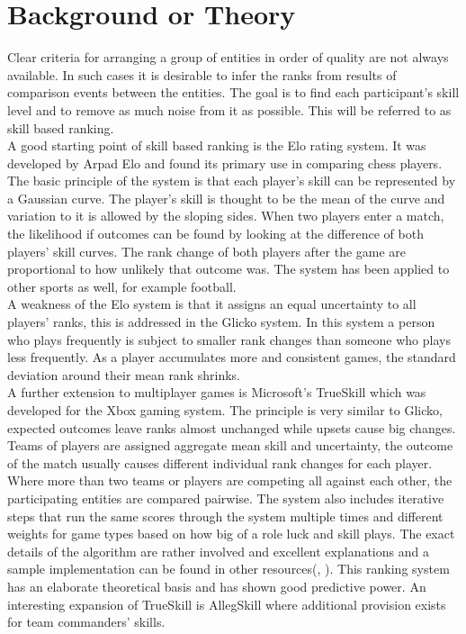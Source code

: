 \section{Background or Theory}
Clear criteria for arranging a group of entities in order of quality are not always available. In such cases it is desirable to infer the ranks from results of comparison events between the entities. The goal is to find each participant's skill level and to remove as much noise from it as possible. This will be referred to as skill based ranking.\\
A good starting point of skill based ranking is the Elo rating system\cite{elo}. It was developed by Arpad Elo and found its primary use in comparing chess players. The basic principle of the system is that each player's skill can be represented by a Gaussian curve. The player's skill is thought to be the mean of the curve and variation to it is allowed by the sloping sides. When two players enter a match, the likelihood if outcomes can be found by looking at the difference of both players' skill curves. The rank change of both players after the game are proportional to how unlikely that outcome was. The system has been applied to other sports as well, for example football\cite{football}.\\
A weakness of the Elo system is that it assigns an equal uncertainty to all players' ranks, this is addressed in the Glicko system\cite{glicko}. In this system a person who plays frequently is subject to smaller rank changes than someone who plays less frequently. As a player accumulates more and consistent games, the standard deviation around their mean rank shrinks.\\
A further extension to multiplayer games is Microsoft's TrueSkill which was developed for the Xbox gaming system\cite{trueskill}. The principle is very similar to Glicko, expected outcomes leave ranks almost unchanged while upsets cause big changes. Teams of players are assigned aggregate mean skill and uncertainty, the outcome of the match usually causes different individual rank changes for each player. Where more than two teams or players are competing all against each other, the participating entities are compared pairwise. The system also includes iterative steps that run the same scores through the system multiple times and different weights for game types based on how big of a role luck and skill plays. The exact details of the algorithm are rather involved and excellent explanations and a sample implementation can be found in other resources(\cite{trueskillMicrosoft}, \cite{trueskillSimple}). This ranking system has an elaborate theoretical basis and has shown good predictive power\cite{trueskill}. An interesting expansion of TrueSkill is AllegSkill\cite{allegskill} where additional provision exists for team commanders' skills.\\
